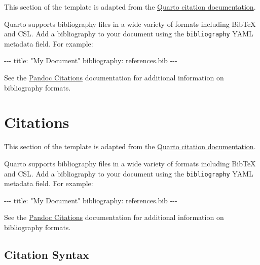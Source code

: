 \documentclass[
]{interact}
\newenvironment{Shaded}{\begin{snugshade}}{\end{snugshade}}
\newcommand{\AttributeTok}[1]{\textcolor[rgb]{0.40,0.45,0.13}{#1}}
\newcommand{\FunctionTok}[1]{\textcolor[rgb]{0.28,0.35,0.67}{#1}}
\newcommand{\KeywordTok}[1]{\textcolor[rgb]{0.00,0.23,0.31}{#1}}
\newcommand{\PreprocessorTok}[1]{\textcolor[rgb]{0.68,0.00,0.00}{#1}}
\newcommand{\StringTok}[1]{\textcolor[rgb]{0.13,0.47,0.30}{#1}}
\begin{document}
This section of the template is adapted from the
\href{https://quarto.org/docs/authoring/footnotes-and-citations.html}{Quarto
citation documentation}.

Quarto supports bibliography files in a wide variety of formats
including BibTeX and CSL. Add a bibliography to your document using the
\texttt{bibliography} YAML metadata field. For example:

\begin{Shaded}
\begin{Highlighting}[]
\PreprocessorTok{{-}{-}{-}}
\FunctionTok{title}\KeywordTok{:}\AttributeTok{ }\StringTok{"My Document"}
\FunctionTok{bibliography}\KeywordTok{:}\AttributeTok{ references.bib}
\PreprocessorTok{{-}{-}{-}}
\end{Highlighting}
\end{Shaded}

See the \href{https://pandoc.org/MANUAL.html\#citations}{Pandoc
Citations} documentation for additional information on bibliography
formats.

\hypertarget{citations-1}{%
\section{Citations}\label{citations-1}}

This section of the template is adapted from the
\href{https://quarto.org/docs/authoring/footnotes-and-citations.html}{Quarto
citation documentation}.

Quarto supports bibliography files in a wide variety of formats
including BibTeX and CSL. Add a bibliography to your document using the
\texttt{bibliography} YAML metadata field. For example:

\begin{Shaded}
\begin{Highlighting}[]
\PreprocessorTok{{-}{-}{-}}
\FunctionTok{title}\KeywordTok{:}\AttributeTok{ }\StringTok{"My Document"}
\FunctionTok{bibliography}\KeywordTok{:}\AttributeTok{ references.bib}
\PreprocessorTok{{-}{-}{-}}
\end{Highlighting}
\end{Shaded}

See the \href{https://pandoc.org/MANUAL.html\#citations}{Pandoc
Citations} documentation for additional information on bibliography
formats.

\hypertarget{sec-citations}{%
\subsection{Citation Syntax}\label{sec-citations}}
\end{document}
